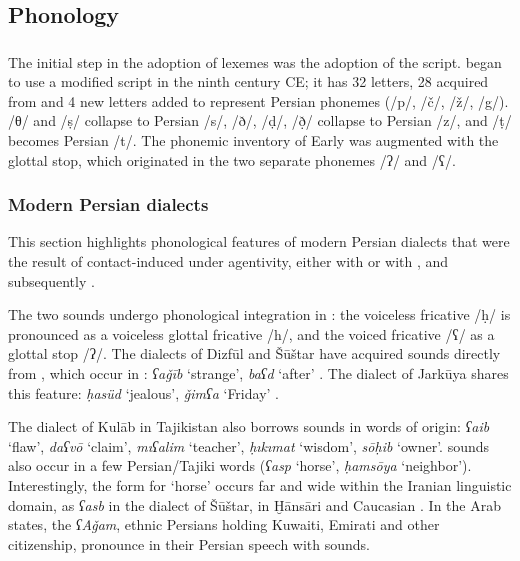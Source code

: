 \documentclass[output=paper]{langsci/langscibook}
\begin{document}
\subsection{Phonology}


\subsubsection{}

The initial step in the adoption of  lexemes was the adoption of the  script.  began to use a modified  script in the ninth century CE; it has 32 letters, 28 acquired from  and 4 new letters added to represent Persian phonemes (/p/, /č/, /ž/, /g/).  /θ/ and /ṣ/ collapse to Persian /s/,  /ð/, /ḍ/, /ð̣/ collapse to Persian /z/, and  /ṭ/ becomes Persian /t/. The phonemic inventory of Early  was augmented with the glottal stop, which originated in the two separate  phonemes /ʔ/ and /ʕ/.

\subsubsection{Modern Persian dialects}

This section highlights phonological features of modern Persian dialects that were the result of contact-induced  under  agentivity, either with  or with , and subsequently .


The two   sounds undergo phonological integration in : the voiceless  fricative /ḥ/ is pronounced as a voiceless glottal fricative /h/, and the voiced  fricative /ʕ/ as a glottal stop /ʔ/. The dialects of Dizfūl and Šūštar have acquired  sounds directly from , which occur in  : \textit{ʕaǧīb} ‘strange’, \textit{baʕd} ‘after’ \citep{MacKinnon2015}. The dialect of Jarkūya shares this feature: \textit{ḥasüd} ‘jealous’, \textit{ǧimʕa} ‘Friday’ \citep{Borjian2008}.

The dialect of Kulāb in Tajikistan also borrows   sounds in words of  origin: \textit{ʕaib} ‘flaw’, \textit{daʕvō} ‘claim’, \textit{mıʕalim} ‘teacher’, \textit{ḥıkımat} ‘wisdom’, \textit{sōḥib} ‘owner’.   sounds also occur in a few Persian/Tajiki words (\textit{ʕasp} ‘horse’, \textit{ḥamsōya} ‘neighbor’). Interestingly, the  form for ‘horse’ occurs far and wide within the Iranian linguistic domain, as \textit{ʕasb} in the  dialect of Šūštar, in Ḫānsāri and Caucasian . In the Arab  states, the \textit{ʕAǧam}, ethnic Persians holding Kuwaiti, Emirati and other  citizenship, pronounce   in their Persian speech with  sounds.
\end{document}
